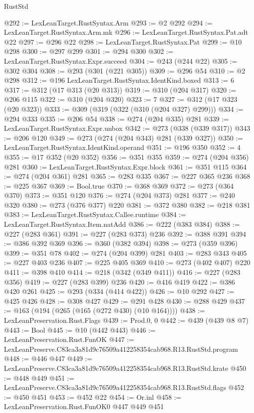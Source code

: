 \begin{lexlean}{RustStd}
\begin{coremodule}
@292 := LexLeanTarget.RustSyntax.Arm
@293 := @2 @292
@294 := LexLeanTarget.RustSyntax.Arm.mk
@296 := LexLeanTarget.RustSyntax.Pat.adt @22
@297 := @296 @22
@298 := LexLeanTarget.RustSyntax.Pat
@299 := @10 @298
@300 := @297 @299
@301 := @294 @300
@302 := LexLeanTarget.RustSyntax.Expr.succeed
@304 := @243 (@244 @22)
@305 := @302 @304
@308 := @293 (@301 (@221 @305))
@309 := @296 @54
@310 := @2 @298
@312 := @196 LexLeanTarget.RustSyntax.IdentKind.boxed
@313 := 6
@317 := @312 (@17 @313 (@20 @313))
@319 := @310 (@204 @317)
@320 := @206 @115
@322 := @310 (@204 @320)
@323 := 7
@327 := @312 (@17 @323 (@20 @323))
@333 := @309 (@319 (@322 (@310 (@204 @327) @299)))
@334 := @294 @333
@335 := @206 @54
@338 := @274 (@204 @335) @281
@339 := LexLeanTarget.RustSyntax.Expr.unbox
@342 := @273 (@338 (@339 @317))
@343 := @206 @120
@349 := @273 (@274 (@204 @343) @281 (@339 @327))
@350 := LexLeanTarget.RustSyntax.IdentKind.operand
@351 := @196 @350
@352 := 4
@355 := @17 @352 (@20 @352)
@356 := @351 @355
@359 := @274 (@204 @356) @281
@360 := LexLeanTarget.RustSyntax.Expr.block
@361 := @351 @115
@364 := @274 (@204 @361) @281
@365 := @283 @335
@367 := @227 @365 @236
@368 := @225 @367
@369 := Bool.true
@370 := @368 @369
@372 := @273 (@364 @370)
@373 := @351 @120
@376 := @274 (@204 @373) @281
@377 := @240 @320
@380 := @273 (@376 @377) @220
@381 := @372 @380
@382 := @218 @381
@383 := LexLeanTarget.RustSyntax.Callee.runtime
@384 := LexLeanTarget.RustSyntax.Item.natAdd
@386 := @222 (@383 @384)
@388 := @227 (@283 @361)
@391 := @227 (@283 @373) @236
@392 := @388 @391
@394 := @386 @392 @369
@396 := @360 (@382 @394)
@398 := @273 (@359 @396)
@399 := @351 @78
@402 := @274 (@204 @399) @281
@403 := @283 @343
@405 := @227 @403 @236
@407 := @225 @405 @369
@410 := @273 (@402 @407) @220
@411 := @398 @410
@414 := @218 (@342 (@349 @411))
@416 := @227 (@283 @356)
@419 := @227 (@283 @399) @236
@420 := @416 @419
@422 := @386 @420 @261
@425 := @293 (@334 (@414 @422))
@426 := @10 @292
@427 := @425 @426
@428 := @308 @427
@429 := @291 @428
@430 := @288 @429
@437 := @163 (@194 (@265 (@165 (@272 @430) (@10 @164))))
@438 := LexLeanPreservation.Rust.Flags
@439 := Prod.{0, 0}
@442 := @439 (@439 @8 @7)
@443 := Bool
@445 := @10 (@442 @443)
@446 := LexLeanPreservation.Rust.FunOK
@447 := LexLeanPreserve.C83ca3a81d9c76509a412258354cab968.R13.RustStd.program
@448 := @446 @447
@449 := LexLeanPreserve.C83ca3a81d9c76509a412258354cab968.R13.RustStd.krate
@450 := @448 @449
@451 := LexLeanPreserve.C83ca3a81d9c76509a412258354cab968.R13.RustStd.flags
@452 := @450 @451
@453 := @452 @22
@454 := Or.inl
@458 := LexLeanPreservation.Rust.FunOK0 @447 @449 @451

\end{coremodule}
\end{lexlean}
